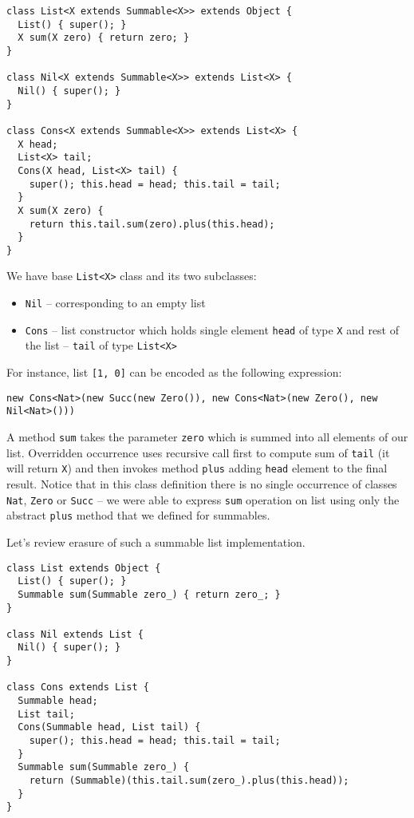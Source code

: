 \documentclass{article}[12pt]
\begin{document}
\begin{verbatim}
class List<X extends Summable<X>> extends Object {
  List() { super(); }
  X sum(X zero) { return zero; }
}

class Nil<X extends Summable<X>> extends List<X> {
  Nil() { super(); }
}

class Cons<X extends Summable<X>> extends List<X> {
  X head;
  List<X> tail;
  Cons(X head, List<X> tail) {
    super(); this.head = head; this.tail = tail;
  }
  X sum(X zero) {
    return this.tail.sum(zero).plus(this.head);
  }
}
\end{verbatim}
We have base \texttt{List<X>} class and its two subclasses:
\begin{itemize}
\item \texttt{Nil} -- corresponding to an empty list
\item \texttt{Cons} -- list constructor which holds single
  element \texttt{head} of type \texttt{X} and rest of the list
   -- \texttt{tail} of type \texttt{List<X>}
\end{itemize}
For instance, list \texttt{[1, 0]} can be encoded as
the following expression:

\begin{verbatim}
new Cons<Nat>(new Succ(new Zero()), new Cons<Nat>(new Zero(), new Nil<Nat>()))
\end{verbatim}

A method \texttt{sum} takes the parameter \texttt{zero} which is
summed into all elements of our list. Overridden occurrence
uses recursive call first to compute sum of \texttt{tail} (it will
return \texttt{X}) and then invokes method \texttt{plus} adding
\texttt{head} element to the final result. Notice that in this
class definition there is no single occurrence of classes \texttt{Nat},
\texttt{Zero} or \texttt{Succ} -- we were able to express
\texttt{sum} operation on list using only the abstract \texttt{plus}
method that we defined for summables.

Let's review erasure of such a summable list implementation.

\begin{verbatim}
class List extends Object {
  List() { super(); }
  Summable sum(Summable zero_) { return zero_; }
}

class Nil extends List {
  Nil() { super(); }
}

class Cons extends List {
  Summable head;
  List tail;
  Cons(Summable head, List tail) {
    super(); this.head = head; this.tail = tail;
  }
  Summable sum(Summable zero_) {
    return (Summable)(this.tail.sum(zero_).plus(this.head));
  }
}
\end{verbatim}
\end{document}
